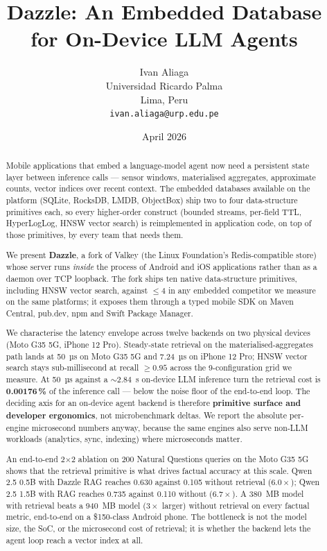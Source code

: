 \documentclass[11pt]{article}
\title{Dazzle: An Embedded Database for On-Device LLM Agents}
\author{
    Ivan Aliaga \\
    Universidad Ricardo Palma \\
    Lima, Peru \\
    \texttt{ivan.aliaga@urp.edu.pe}
}
\date{April 2026}
\let\OldTexttt\texttt
\renewcommand{\texttt}[1]{\OldTexttt{\seqsplit{#1}}}
\begin{document}
\maketitle

\begin{abstract}
Mobile applications that embed a language-model agent now need a
persistent state layer between inference calls --- sensor windows,
materialised aggregates, approximate counts, vector indices over
recent context. The embedded databases available on the platform
(SQLite, RocksDB, LMDB, ObjectBox) ship two to four data-structure
primitives each, so every higher-order construct (bounded streams,
per-field TTL, HyperLogLog, HNSW vector search) is reimplemented
in application code, on top of those primitives, by every team
that needs them.

We present \textbf{Dazzle}, a fork of Valkey (the Linux
Foundation's Redis-compatible store) whose server runs
\emph{inside} the process of Android and iOS applications rather
than as a daemon over TCP loopback. The fork ships ten native
data-structure primitives, including HNSW vector search, against
$\leq 4$ in any embedded competitor we measure on the same
platforms; it exposes them through a typed mobile SDK on Maven
Central, pub.dev, npm and Swift Package Manager.

We characterise the latency envelope across twelve backends on
two physical devices (Moto G35 5G, iPhone 12 Pro). Steady-state
retrieval on the materialised-aggregates path lands at 50~µs on
Moto G35 5G and 7.24~µs on iPhone 12 Pro; HNSW vector search
stays sub-millisecond at recall $\geq 0.95$ across the
9-configuration grid we measure. At 50~µs against a
$\sim 2.84$~s on-device LLM inference turn the retrieval cost is
\textbf{0.00176\,\%} of the inference call --- below the noise
floor of the end-to-end loop. The deciding axis for an on-device
agent backend is therefore \textbf{primitive surface and
developer ergonomics}, not microbenchmark deltas. We report the
absolute per-engine microsecond numbers anyway, because the same
engines also serve non-LLM workloads (analytics, sync, indexing)
where microseconds matter.

An end-to-end 2$\times$2 ablation on 200 Natural Questions queries
on the Moto G35 5G shows that the retrieval primitive is what
drives factual accuracy at this scale. Qwen 2.5 0.5B with Dazzle
RAG reaches 0.630 \texttt{EM\_contains} against 0.105 without
retrieval ($6.0\times$); Qwen 2.5 1.5B with RAG reaches 0.735
against 0.110 without ($6.7\times$). A 380~MB model with
retrieval beats a 940~MB model ($3\times$ larger) without
retrieval on every factual metric, end-to-end on a
\$150-class Android phone. The bottleneck is not the model size,
the SoC, or the microsecond cost of retrieval; it is whether the
backend lets the agent loop reach a vector index at all.
\end{abstract}






\end{document}
